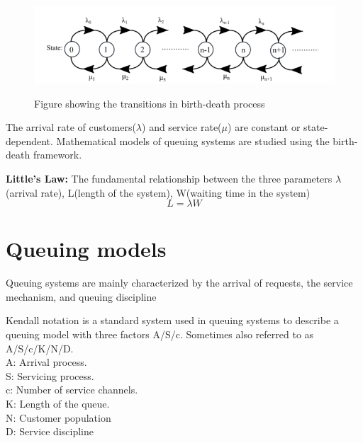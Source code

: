 \begin{figure}[ht!]
        \centering
        \includegraphics[scale=0.60]{birth_death.png}
        \\\caption{Figure showing the transitions in birth-death process}
        \label{birth-death}
\end{figure}

The arrival rate of customers($\lambda$) and service rate($\mu$) are constant or state-dependent.
Mathematical models of queuing systems are studied using the birth-death framework.

\begin{definition}
\textbf{Little’s Law:}
The fundamental relationship between the three parameters $\lambda$(arrival rate), L(length of the system), W(waiting time in the system)
\[
L = \lambda W
\]
\end{definition}

\section{Queuing models}
Queuing systems are mainly characterized by the arrival of requests, the service mechanism, and queuing discipline

\begin{definition}\label{kendall notation}
Kendall notation is a standard system used in queuing systems to describe a queuing model with three factors A/S/c. Sometimes also referred to as A/S/c/K/N/D.
\\A: Arrival process.
\\S: Servicing process.
\\c: Number of service channels.
\\K: Length of the queue.
\\N: Customer population
\\D: Service discipline
\end{definition}

